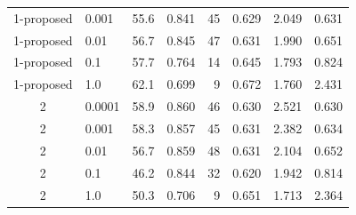 \documentclass[12pt]{jarticle}
\numberwithin{equation}{section}    %
\numberwithin{figure}{section}      %
\numberwithin{table}{section}      %
\begin{document}
\begin{table}[bt]
\begin{center}
{\begin{tabular}{|c|l|rrrrrr|}
                1-proposed               & 0.001                                    & 55.6                         & 0.841                     & 45                         & 0.629                         & 2.049                             & 0.631                    \\
                1-proposed               & 0.01                                     & 56.7                         & 0.845                     & 47                         & 0.631                         & 1.990                             & 0.651                    \\
                1-proposed               & 0.1                                      & 57.7                         & 0.764                     & 14                         & 0.645                         & 1.793                             & 0.824                    \\
                1-proposed               & 1.0                                      & 62.1                         & 0.699                     & 9                          & 0.672                         & 1.760                             & 2.431                    \\
                \hline
                2                        & 0.0001                                   & 58.9                         & 0.860                     & 46                         & 0.630                         & 2.521                             & 0.630                    \\
                2                        & 0.001                                    & 58.3                         & 0.857                     & 45                         & 0.631                         & 2.382                             & 0.634                    \\
                2                        & 0.01                                     & 56.7                         & 0.859                     & 48                         & 0.631                         & 2.104                             & 0.652                    \\
                2                        & 0.1                                      & 46.2                         & 0.844                     & 32                         & 0.620                         & 1.942                             & 0.814                    \\
                2                        & 1.0                                      & 50.3                         & 0.706                     & 9                          & 0.651                         & 1.713                             & 2.364                    \\

\end{tabular}}
\end{center}
\end{table}
\end{document}
